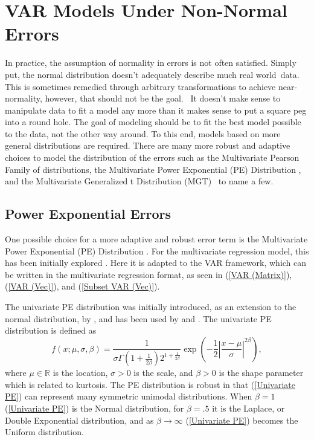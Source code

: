 
\chapter{VAR Models Under Non-Normal Errors}

In practice, the assumption of normality in errors is not often satisfied.
Simply put, the normal distribution doesn't adequately describe much
\textquotedbl{}real world\textquotedbl{}\ data. This is sometimes
remedied through arbitrary transformations to achieve near-normality,
however, that should not be the goal. \ It doesn't make sense to
manipulate data to fit a model any more than it makes sense to put
a square peg into a round hole. The goal of modeling should be to
fit the best model possible to the data, not the other way around.
To this end, models based on more general distributions are required.
There are many more robust and adaptive choices to model the distribution
of the errors such as the Multivariate Pearson Family of distributions,
the Multivariate Power Exponential (PE) Distribution \citet{Gome:Gome:Mari:1998},
and the Multivariate Generalized t Distribution (MGT) \citet{Arsl:2004}\ to
name a few.


\section{Power Exponential Errors}

One possible choice for a more adaptive and robust error term is the
Multivariate Power Exponential (PE) Distribution \citet{Gome:Gome:Mari:1998}.
For the multivariate regression model, this has been initially explored
\citet{Liu:Boz:2004}. Here it is adapted to the VAR framework, which
can be written in the multivariate regression format, as seen in (\ref{VAR (Matrix)}),
(\ref{VAR (Vec)}), and (\ref{Subset VAR (Vec)}).

The univariate PE distribution was initially introduced, as an extension
to the normal distribution, by \citet{Subb:1923}, and has been used
by \citet{Box:1953} and \citet{Box:Tiao:1973}. The univariate PE
distribution is defined as
\begin{equation}
f\left(x;\mu,\sigma,\beta\right)=\frac{1}{\sigma\Gamma\left(1+\frac{1}{2\beta}\right)2^{1+\frac{1}{2\beta}}}\exp\left(-\frac{1}{2}\left\vert \frac{x-\mu}{\sigma}\right\vert ^{2\beta}\right),\label{Univariate PE}
\end{equation}
where $\mu\in\mathbb{R}$ is the location, $\sigma>0$ is the scale,
and $\beta>0$ is the shape parameter which is related to kurtosis.
The PE distribution is robust in that (\ref{Univariate PE}) can represent
many symmetric unimodal distributions. When $\beta=1$ (\ref{Univariate PE})
is the Normal distribution, for $\beta=.5$ it is the Laplace, or
Double Exponential distribution, and as $\beta\rightarrow\infty$
(\ref{Univariate PE}) becomes the Uniform distribution.

